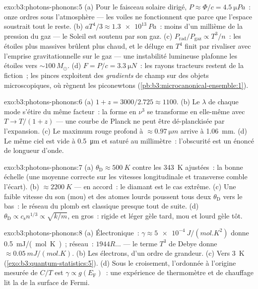 \begin{solution}{exo:b3:photons-phonons:5}
(a) Pour le faisceau solaire dirigé, $P \approx \Phi/c =
\qty{4.5}{\micro Pa}$~: onze ordres sous l'atmosphère --- les
voiles ne fonctionnent que parce que l'espace soustrait tout le
reste. (b)
$aT^4/3 \approx \qty{1.3e13}{Pa}$~: moins d'un millième de la
pression du gaz --- le Soleil est soutenu par son gaz. (c)
$P_{\text{rad}}/P_{\text{gaz}} \propto T^3/n$~: les étoiles plus
massives brûlent plus chaud, et le déluge en $T^4$ finit par
rivaliser avec l'emprise gravitationnelle sur le gaz --- une
instabilité lumineuse plafonne les étoiles vers
$\sim100\,M_\odot$. (d) $F = P/c = \qty{3.3}{\micro N}$~: les
rayons tracteurs restent de la fiction~; les pinces exploitent des
\emph{gradients} de champ sur des objets microscopiques, où
règnent les piconewtons
(\cref{pb:b3:microcanonical-ensemble:1}).
\end{solution}

\begin{solution}{exo:b3:photons-phonons:6}
(a) $1 + z = 3000/2.725 \approx 1100$. (b) Le $\lambda$ de chaque
mode s'étire du même facteur~: la forme en $\nu^3$ se transforme en
elle-même avec $T \to T/(1+z)$ --- une courbe de Planck ne peut
être dé-planckisée par l'expansion. (c) Le maximum rouge profond à
$\approx\qty{0.97}{\micro m}$ arrive à \qty{1.06}{mm}. (d) Le même
ciel est vide à \qty{0.5}{\micro m} et saturé au millimètre~:
l'obscurité est un énoncé de longueur d'onde.
\end{solution}

\begin{solution}{exo:b3:photons-phonons:7}
(a) $\theta_{\text{D}} \approx \qty{500}{K}$ contre les
\qty{343}{K} ajustées~: la bonne échelle (une moyenne correcte sur
les vitesses longitudinale et transverse comble l'écart). (b)
$\approx\qty{2200}{K}$ --- en accord~: le diamant est le cas
extrême. (c) Une faible vitesse du son (mou) et des atomes lourds
poussent tous deux $\theta_{\text{D}}$ vers le bas~: le réseau du
plomb est classique presque tout de suite. (d) $\theta_{\text{D}} \propto
c_{\text{s}}n^{1/3} \propto \sqrt{k/m}$, en gros~: rigide et léger
gèle tard, mou et lourd gèle tôt.
\end{solution}

\begin{solution}{exo:b3:photons-phonons:8}
(a) Électronique~: $\gamma \approx \qty{5e-4}{J/(mol.K^2)}$ donne
\qty{0.5}{mJ/(mol.K)}~; réseau~: $1944R\dots$ --- le terme $T^3$ de
Debye donne $\approx\qty{0.05}{mJ/(mol.K)}$. (b) Les électrons,
d'un ordre de grandeur. (c) Vers \qty{3}{K}
(\cref{exo:b3:quantum-statistics:5}). (d) Sous le croisement,
l'ordonnée à l'origine mesurée de $C/T$ est
$\gamma \propto g(E_{\text{F}})$~: une expérience de thermomètre et
de chauffage lit la  de la surface de Fermi.
\end{solution}

